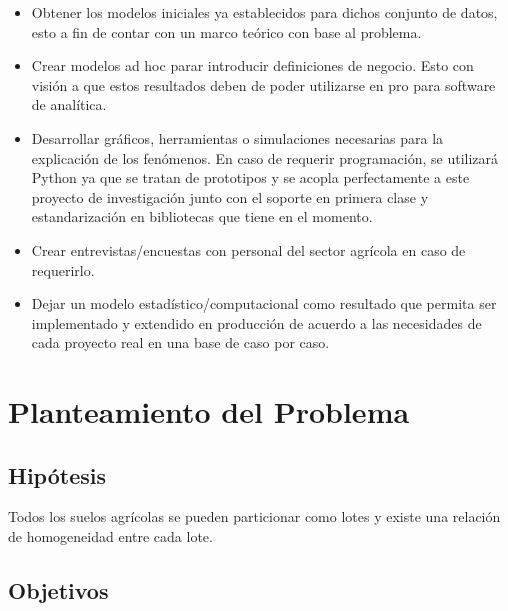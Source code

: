\documentclass[conference]{IEEEtran}
\begin{document}
\begin{itemize}
    \item Obtener los modelos iniciales ya establecidos para dichos conjunto de datos, esto a fin de contar con un marco teórico con base al problema.
    
    \item Crear modelos ad hoc parar introducir definiciones de negocio. Esto con visión a que estos resultados deben de poder utilizarse en pro para software de analítica.
    
    \item Desarrollar gráficos, herramientas o simulaciones necesarias para la explicación de los fenómenos. En caso de requerir programación, se utilizará Python ya que se tratan de prototipos y se acopla perfectamente a este proyecto de investigación junto con el soporte en primera clase y estandarización en bibliotecas que tiene en el momento.
    
    \item Crear entrevistas/encuestas con personal del sector agrícola en caso de requerirlo.
    
    \item Dejar un modelo estadístico/computacional como resultado que permita ser implementado y extendido en producción de acuerdo a las necesidades de cada proyecto real en una base de caso por caso.
\end{itemize}







\section{Planteamiento del Problema}

\subsection{Hipótesis}

Todos los suelos agrícolas se pueden particionar como lotes y existe una relación de homogeneidad entre cada lote.

\subsection{Objetivos}
\end{document}

